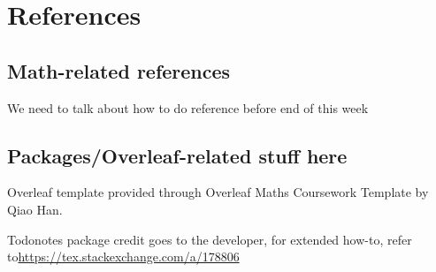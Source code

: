 \section{References}

\subsection{Math-related references}
We need to talk about how to do reference before end of this week

\subsection{Packages/Overleaf-related stuff here}

Overleaf template provided through Overleaf Maths Coursework Template by Qiao Han.
\newline

Todonotes package credit goes to the developer, for extended how-to, refer to\newline \mbox{\url{https://tex.stackexchange.com/a/178806}}


